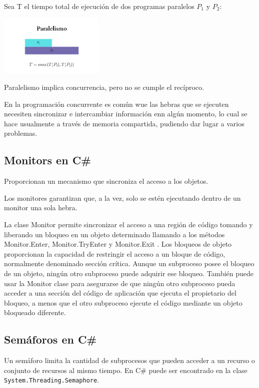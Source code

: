 \documentclass[10pt]{article} %
\newcommand{\csl}[1]{\colorbox{backcolour}{\texttt{#1}}}
\begin{document}
Sea T el tiempo total de ejecuci\'on de dos programas paralelos $ P_{1} $ y $ P_{2} $:

\begin{center}
	\includegraphics[width=5cm]{paralelismo.png}
\end{center}

Paralelismo implica concurrencia, pero no se cumple el rec\'iproco.

En la programaci\'on concurrente es com\'un wue las hebras que se ejecuten necesiten sincronizar e intercambiar informaci\'on enn alg\'un momento, lo cual se hace usualmente a trav\'es de memoria compartida, pudiendo dar lugar a varios problemas.

\subsection{Monitors en C\#}
Proporcionan un mecanismo que sincroniza el acceso a los objetos.

Los monitores garantizan que, a la vez, solo se estén ejecutando
dentro de un monitor una sola hebra.

La clase Monitor permite sincronizar el acceso a una región de código tomando y liberando un bloqueo en un objeto determinado llamando a los métodos Monitor.Enter, Monitor.TryEnter y Monitor.Exit . Los bloqueos de objeto proporcionan la capacidad de restringir el acceso a un bloque de código, normalmente denominado sección crítica. Aunque un subproceso posee el bloqueo de un objeto, ningún otro subproceso puede adquirir ese bloqueo. También puede usar la Monitor clase para asegurarse de que ningún otro subproceso pueda acceder a una sección del código de aplicación que ejecuta el propietario del bloqueo, a menos que el otro subproceso ejecute el código mediante un objeto bloqueado diferente.

\subsection{Sem\'aforos en C\#}

Un sem\'aforo limita la cantidad de subprocesos que pueden acceder a un recurso o conjunto de recursos al mismo tiempo. En C\# puede ser encontrado en la clase \csl{System.Threading.Semaphore}.
\end{document}
